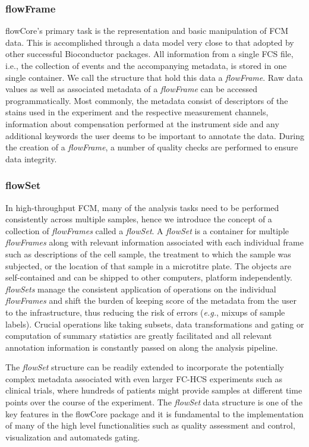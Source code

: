 \documentclass[10pt]{bmc_article}
\newcommand{\Rpackage}[1]{{\textsf{#1}}}
\newcommand{\Rclass}[1]{{\textit{#1}}}
\newenvironment{bmcformat}{\begin{raggedright}\baselineskip20pt\sloppy\setboolean{publ}{false}}{\end{raggedright}\baselineskip20pt\sloppy}
\begin{document}
\begin{bmcformat}
\subsubsection*{flowFrame}
\Rpackage{flowCore}'s primary task is the representation and basic
manipulation of FCM data. This is accomplished through a data model
very close to that adopted by other successful Bioconductor
packages. All information from a single FCS file, i.e., the collection
of events and the accompanying metadata, is stored in one single
container. We call the structure that hold this data a
\Rclass{flowFrame}. Raw data values as well as associated metadata of
a \Rclass{flowFrame} can be accessed programmatically. Most commonly,
the metadata consist of descriptors of the stains used in the
experiment and the respective measurement channels, information about
compensation performed at the instrument side and any additional
keywords the user deems to be important to annotate the data. During
the creation of a \Rclass{flowFrame}, a number of quality checks are
performed to ensure data integrity.

\subsubsection*{flowSet}
In high-throughput FCM, many of the analysis tasks need to be
performed consistently across multiple samples, hence we introduce the
concept of a collection of \Rclass{flowFrames} called a
\Rclass{flowSet}. A \Rclass{flowSet} is a container for multiple
\Rclass{flowFrames} along with relevant information associated with
each individual frame such as descriptions of the cell sample, the
treatment to which the sample was subjected, or the location of that
sample in a microtitre plate.  The objects are self-contained and can
be shipped to other computers, platform
independently. \Rclass{flowSets} manage the consistent application of
operations on the individual \Rclass{flowFrames} and shift the burden
of keeping score of the metadata from the user to the infrastructure,
thus reducing the risk of errors (\textit{e.g.}, mixups of sample
labels). Crucial operations like taking subsets, data transformations
and gating or computation of summary statistics are greatly
facilitated and all relevant annotation information is constantly
passed on along the analysis pipeline.

The \Rclass{flowSet} structure can be readily extended to incorporate
the potentially complex metadata associated with even larger FC-HCS
experiments such as clinical trials, where hundreds of patients might
provide samples at different time points over the course of the
experiment. The \Rclass{flowSet} data structure is one of the key
features in the \Rpackage{flowCore} package and it is fundamental to
the implementation of many of the high level functionalities such as
quality assessment and control, visualization and automateds gating.


\end{bmcformat}
\end{document}
